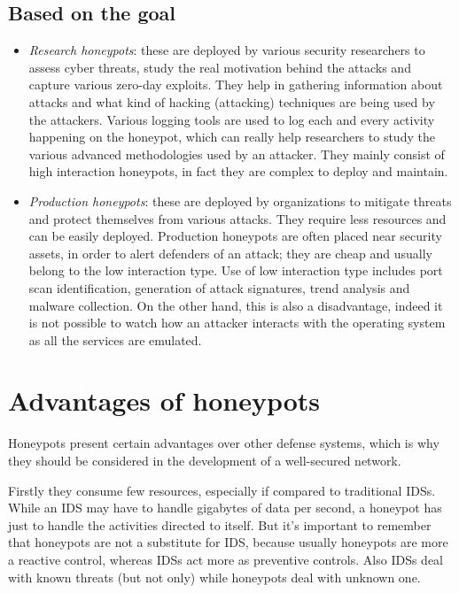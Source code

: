 \documentclass[epsfig,a4paper,11pt,titlepage,oneside,openany]{book}
\begin{document}
\section{Based on the goal}

\begin{itemize}
\item \textit{Research honeypots}: these are deployed by various security researchers to assess cyber threats, study the real motivation behind the attacks and capture various zero-day exploits. They help in gathering information about attacks and what kind of hacking (attacking) techniques are being used by the attackers. Various logging tools are used to log each and every activity happening on the honeypot, which can really help researchers to study the various advanced methodologies used by an attacker. They mainly consist of high interaction honeypots, in fact they are complex to deploy and maintain.


\item \textit{Production honeypots}: these are deployed by organizations to mitigate threats and protect themselves from various attacks. They require less resources and can be easily deployed. Production honeypots are often placed near security assets, in order to alert defenders of an attack; they are cheap and usually belong to the low interaction type. Use of low interaction type includes port scan identification, generation of attack signatures, trend analysis and malware collection. On the other hand, this is also a disadvantage, indeed it is not possible to watch how an attacker interacts with the operating system as all the services are emulated.


\end{itemize}

\chapter{Advantages of honeypots}
Honeypots present certain advantages over other defense systems, which is why they should be considered in the development of a well-secured network.

Firstly they consume few resources, especially if compared to traditional IDSs. While an IDS may have to handle gigabytes of data per second, a honeypot has just to handle the activities directed to itself. But it’s important to remember that honeypots are not a substitute for IDS, because usually honeypots are more a reactive control, whereas IDSs act more as preventive controls. Also IDSs deal with known threats (but not only) while honeypots deal with unknown one.
\end{document}

